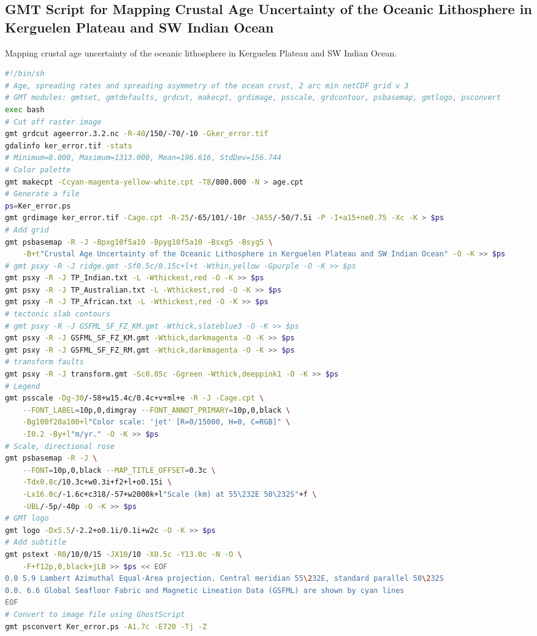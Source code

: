 \documentclass[geomatics,article,accept,pdftex,moreauthors]{Definitions/mdpi}
\begin{document}
\subsection[\appendixname~\thesubsection]{GMT Script for Mapping Crustal Age Uncertainty of the Oceanic Lithosphere in Kerguelen Plateau and SW Indian Ocean}
\vspace{-9pt}
\begin{listing}[H]
\caption{Mapping crustal age uncertainty of the oceanic lithosphere in Kerguelen Plateau and SW Indian Ocean.}
\label{lst05}
\begin{lstlisting}[xleftmargin=10pt,xrightmargin=3.5pt ,language=bash,caption={}]
#!/bin/sh
# Age, spreading rates and spreading asymmetry of the ocean crust, 2 arc min netCDF grid v 3
# GMT modules: gmtset, gmtdefaults, grdcut, makecpt, grdimage, psscale, grdcontour, psbasemap, gmtlogo, psconvert
exec bash
# Cut off raster image
gmt grdcut ageerror.3.2.nc -R-40/150/-70/-10 -Gker_error.tif
gdalinfo ker_error.tif -stats
# Minimum=8.000, Maximum=1313.000, Mean=196.616, StdDev=156.744
# Color palette
gmt makecpt -Ccyan-magenta-yellow-white.cpt -T8/800.000 -N > age.cpt
# Generate a file
ps=Ker_error.ps
gmt grdimage ker_error.tif -Cage.cpt -R-25/-65/101/-10r -JA55/-50/7.5i -P -I+a15+ne0.75 -Xc -K > $ps
# Add grid
gmt psbasemap -R -J -Bpxg10f5a10 -Bpyg10f5a10 -Bsxg5 -Bsyg5 \
    -B+t"Crustal Age Uncertainty of the Oceanic Lithosphere in Kerguelen Plateau and SW Indian Ocean" -O -K >> $ps
# gmt psxy -R -J ridge.gmt -Sf0.5c/0.15c+l+t -Wthin,yellow -Gpurple -O -K >> $ps
gmt psxy -R -J TP_Indian.txt -L -Wthickest,red -O -K >> $ps
gmt psxy -R -J TP_Australian.txt -L -Wthickest,red -O -K >> $ps
gmt psxy -R -J TP_African.txt -L -Wthickest,red -O -K >> $ps
# tectonic slab contours
# gmt psxy -R -J GSFML_SF_FZ_KM.gmt -Wthick,slateblue3 -O -K >> $ps
gmt psxy -R -J GSFML_SF_FZ_KM.gmt -Wthick,darkmagenta -O -K >> $ps
gmt psxy -R -J GSFML_SF_FZ_RM.gmt -Wthick,darkmagenta -O -K >> $ps
# transform faults
gmt psxy -R -J transform.gmt -Sc0.05c -Ggreen -Wthick,deeppink1 -O -K >> $ps  
# Legend
gmt psscale -Dg-30/-58+w15.4c/0.4c+v+ml+e -R -J -Cage.cpt \
    --FONT_LABEL=10p,0,dimgray --FONT_ANNOT_PRIMARY=10p,0,black \
    -Bg100f20a100+l"Color scale: 'jet' [R=0/15000, H=0, C=RGB]" \
    -I0.2 -By+l"m/yr." -O -K >> $ps
# Scale, directional rose
gmt psbasemap -R -J \
    --FONT=10p,0,black --MAP_TITLE_OFFSET=0.3c \
    -Tdx0.8c/10.3c+w0.3i+f2+l+o0.15i \
    -Lx16.0c/-1.6c+c318/-57+w2000k+l"Scale (km) at 55\232E 50\232S"+f \
    -UBL/-5p/-40p -O -K >> $ps
# GMT logo
gmt logo -Dx5.5/-2.2+o0.1i/0.1i+w2c -O -K >> $ps
# Add subtitle
gmt pstext -R0/10/0/15 -JX10/10 -X0.5c -Y13.0c -N -O \
    -F+f12p,0,black+jLB >> $ps << EOF
0.0 5.9 Lambert Azimuthal Equal-Area projection. Central meridian 55\232E, standard parallel 50\232S
0.0. 6.6 Global Seafloor Fabric and Magnetic Lineation Data (GSFML) are shown by cyan lines
EOF
# Convert to image file using GhostScript
gmt psconvert Ker_error.ps -A1.7c -E720 -Tj -Z
\end{lstlisting}
\end{listing}
\end{document}
